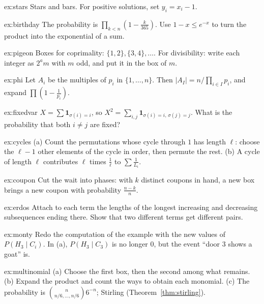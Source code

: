 \begin{hint}{ex:stars}
Stars and bars. For positive solutions, set $y_i=x_i-1$.
\end{hint}
\begin{hint}{ex:birthday}
The probability is $\prod_{k<n}\left(1-\frac k{365}\right)$. Use $1-x\le e^{-x}$ to turn the product into the exponential of a sum.
\end{hint}
\begin{hint}{ex:pigeon}
Boxes for coprimality: $\{1,2\},\{3,4\},\dots$. For divisibility: write each integer as $2^a m$ with $m$ odd, and put it in the box of $m$.
\end{hint}
\begin{hint}{ex:phi}
Let $A_i$ be the multiples of $p_i$ in $\{1,\dots,n\}$. Then $|A_I|=n/\prod_{i\in I}p_i$, and expand $\prod\left(1-\frac1{p_i}\right)$.
\end{hint}
\begin{hint}{ex:fixedvar}
$X=\sum\mathbf 1_{\sigma(i)=i}$, so $X^2=\sum_{i,j}\mathbf 1_{\sigma(i)=i,\,\sigma(j)=j}$. What is the probability that both $i\ne j$ are fixed?
\end{hint}
\begin{hint}{ex:cycles}
(a) Count the permutations whose cycle through $1$ has length $\ell$: choose the $\ell-1$ other elements of the cycle in order, then permute the rest. (b) A cycle of length $\ell$ contributes $\ell$ times $\frac1\ell$ to $\sum\frac1{L_i}$.
\end{hint}
\begin{hint}{ex:coupon}
Cut the wait into phases: with $k$ distinct coupons in hand, a new box brings a new coupon with probability $\frac{n-k}n$.
\end{hint}
\begin{hint}{ex:erdos}
Attach to each term the lengths of the longest increasing and decreasing subsequences ending there. Show that two different terms get different pairs.
\end{hint}
\begin{hint}{ex:monty}
Redo the computation of the example with the new values of $P(H_3\mid C_i)$. In (a), $P(H_3\mid C_3)$ is no longer $0$, but the event ``door $3$ shows a goat'' is.
\end{hint}
\begin{hint}{ex:multinomial}
(a) Choose the first box, then the second among what remains. (b) Expand the product and count the ways to obtain each monomial. (c) The probability is $\binom n{n/6,\dots,n/6}6^{-n}$; Stirling (Theorem~\ref{thm:stirling}).
\end{hint}
